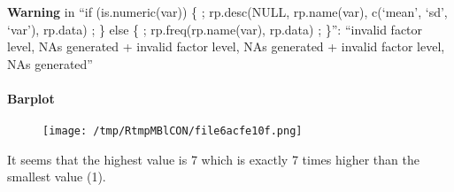 \documentclass{article}
\makeatletter
\def\maxwidth{\ifdim\Gin@nat@width>\linewidth\linewidth
\else\Gin@nat@width\fi}
\let\Oldincludegraphics\includegraphics
\renewcommand{\includegraphics}[1]{\Oldincludegraphics[width=\maxwidth]{#1}}
\makeatother
\begin{document}
\textbf{Warning} in ``if (is.numeric(var)) \{ ; rp.desc(NULL,
rp.name(var), c(`mean', `sd', `var'), rp.data) ; \} else \{ ;
rp.freq(rp.name(var), rp.data) ; \}'': ``invalid factor level, NAs
generated + invalid factor level, NAs generated + invalid factor level,
NAs generated''

\paragraph{Barplot}

\begin{figure}[htbp]
\centering
\texttt{[image: /tmp/RtmpMBlCON/file6acfe10f.png]}
\caption{}
\end{figure}

It seems that the highest value is 7 which is exactly 7 times higher
than the smallest value (1).
\end{document}
